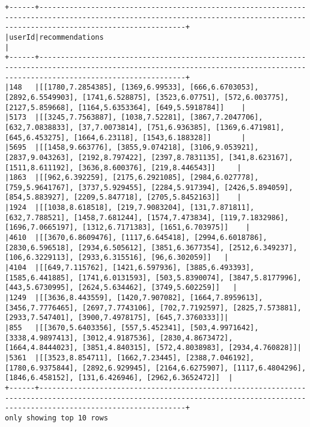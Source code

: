 \documentclass{report}
\begin{document}
    \begin{Verbatim}[commandchars=\\\{\}]
+------+------------------------------------------------------------------------------------------------------------------------------------------------------------------------------+
|userId|recommendations                                                                                                                                                               |
+------+------------------------------------------------------------------------------------------------------------------------------------------------------------------------------+
|148   |[[1780,7.2854385], [1369,6.99533], [666,6.6703053], [2892,6.5549903], [1741,6.528875], [3523,6.07751], [572,6.003775], [2127,5.859668], [1164,5.6353364], [649,5.5918784]]    |
|5173  |[[3245,7.7563887], [1038,7.52281], [3867,7.2047706], [632,7.0838833], [37,7.0073814], [751,6.936385], [1369,6.471981], [645,6.453275], [1664,6.23118], [1543,6.188328]]       |
|5695  |[[1458,9.663776], [3855,9.074218], [3106,9.053921], [2837,9.043263], [2192,8.797422], [2397,8.7831135], [341,8.623167], [1511,8.611192], [3636,8.600376], [219,8.446543]]     |
|1863  |[[962,6.392259], [2175,6.2921085], [2984,6.027778], [759,5.9641767], [3737,5.929455], [2284,5.917394], [2426,5.894059], [854,5.883927], [2209,5.847718], [2705,5.8452163]]    |
|1924  |[[1038,8.618518], [219,7.9083204], [131,7.871811], [632,7.788521], [1458,7.681244], [1574,7.473834], [119,7.1832986], [1696,7.0665197], [1312,6.7171383], [1651,6.703975]]    |
|4610  |[[3670,6.8609476], [1117,6.645418], [2994,6.6018786], [2830,6.596518], [2934,6.505612], [3851,6.3677354], [2512,6.349237], [106,6.3229113], [2933,6.315516], [96,6.302059]]   |
|4104  |[[649,7.115762], [1421,6.597936], [3885,6.493393], [1585,6.441885], [1741,6.0131593], [503,5.8390074], [3847,5.8177996], [443,5.6730995], [2624,5.634462], [3749,5.602259]]   |
|1249  |[[3636,8.443559], [1420,7.907082], [1664,7.8959613], [3456,7.7776465], [2697,7.7743106], [702,7.7192597], [2825,7.573881], [2933,7.547401], [3900,7.4978175], [645,7.3760333]]|
|855   |[[3670,5.6403356], [557,5.452341], [503,4.9971642], [3338,4.9897413], [3012,4.9187536], [2830,4.8673472], [1664,4.8444023], [3851,4.840315], [572,4.8038983], [2934,4.760828]]|
|5361  |[[3523,8.854711], [1662,7.23445], [2388,7.046192], [1780,6.9375844], [2892,6.929945], [2164,6.6275907], [1117,6.4804296], [1846,6.458152], [131,6.426946], [2962,6.3652472]]  |
+------+------------------------------------------------------------------------------------------------------------------------------------------------------------------------------+
only showing top 10 rows


    \end{Verbatim}
\end{document}
